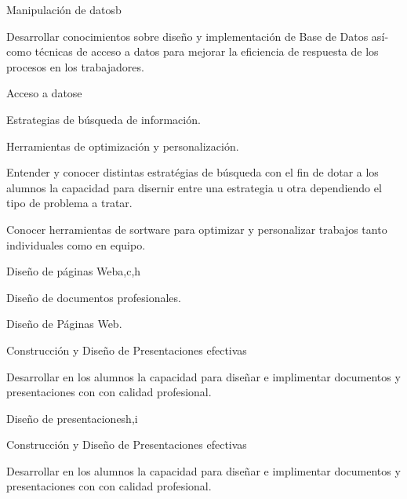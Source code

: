 \begin{syllabus}
\begin{unit}{Manipulación de datos}{}{b}
   \begin{unitgoals}
      \item  Desarrollar conocimientos sobre diseño y implementación de Base de Datos así­ como técnicas de acceso a datos para mejorar la eficiencia de respuesta de los procesos en los trabajadores.
   \end{unitgoals}
\end{unit}

\begin{unit}{Acceso a datos}{}{e}
   \begin{topics}
      \item Estrategias de búsqueda de información.
      \item Herramientas de optimización y personalización.
   \end{topics}

   \begin{unitgoals}
      \item Entender y conocer distintas estratégias de búsqueda con el fin de dotar a los alumnos la capacidad para disernir entre una estrategia  u otra dependiendo el tipo de problema a tratar.
      \item  Conocer herramientas de sortware para optimizar y personalizar trabajos tanto individuales como en equipo.
   \end{unitgoals}
\end{unit}

\begin{unit}{Diseño de páginas Web}{}{a,c,h}
   \begin{topics}
      \item Diseño de documentos profesionales.
      \item Diseño de Páginas Web.
      \item Construcción  y Diseño de Presentaciones  efectivas 
    \end{topics}
  \begin{unitgoals}
      \item Desarrollar en los alumnos la capacidad para diseñar  e implimentar documentos y presentaciones con 
       con calidad profesional.
  \end{unitgoals}
\end{unit}

\begin{unit}{Diseño de presentaciones}{}{h,i}
   \begin{topics}
      \item Construcción  y Diseño de Presentaciones  efectivas 
    \end{topics}
  \begin{unitgoals}
      \item Desarrollar en los alumnos la capacidad para diseñar  e implimentar documentos y presentaciones con 
       con calidad profesional.
  \end{unitgoals}
\end{unit}


\end{syllabus}
